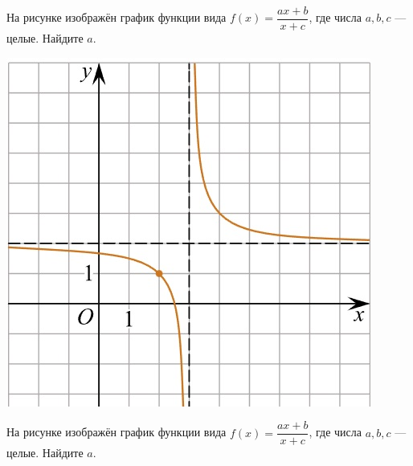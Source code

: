 \begin{class}[number=5]
\begin{listofex}
\begin{minipage}[c]{0.25\textwidth}
		\end{minipage}
		\item
		\begin{minipage}[t]{0.43\textwidth}
			На рисунке изображён график функции вида \(f(x)=\dfrac{ax+b}{x+c}\), где числа \(a, b, c\) --- целые. Найдите \(a\).
		\end{minipage}
		\begin{minipage}[c]{0.25\textwidth}
			\includegraphics[align=t, width=\textwidth]{pics/G101M4C5-4.jpg}
		\end{minipage}
		\item
		\begin{minipage}[t]{0.43\textwidth}
			На рисунке изображён график функции вида \(f(x)=\dfrac{ax+b}{x+c}\), где числа \(a, b, c\) --- целые. Найдите \(a\).
		\end{minipage}
		\begin{minipage}[c]{0.25\textwidth}

\end{minipage}
\end{listofex}
\end{class}
